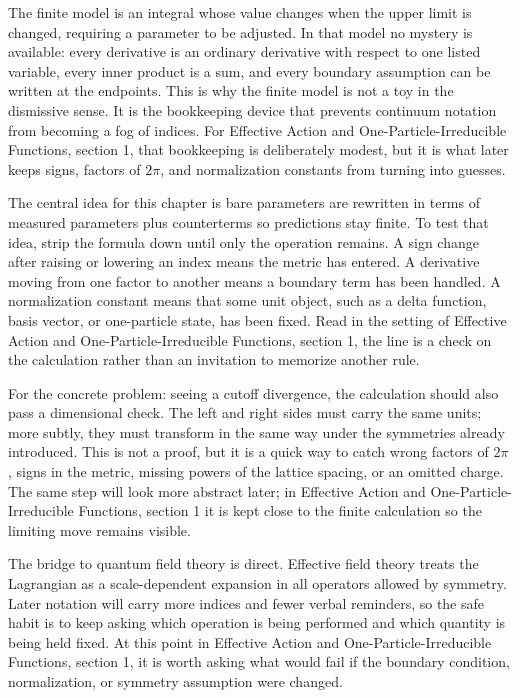 The finite model is an integral whose value changes when the upper limit is changed, requiring a parameter to be adjusted.  In that model no mystery is available: every derivative is an ordinary derivative with respect to one listed variable, every inner product is a sum, and every boundary assumption can be written at the endpoints.  This is why the finite model is not a toy in the dismissive sense.  It is the bookkeeping device that prevents continuum notation from becoming a fog of indices.  For Effective Action and One-Particle-Irreducible Functions, section 1, that bookkeeping is deliberately modest, but it is what later keeps signs, factors of \(2\pi\), and normalization constants from turning into guesses.

The central idea for this chapter is bare parameters are rewritten in terms of measured parameters plus counterterms so predictions stay finite.  To test that idea, strip the formula down until only the operation remains.  A sign change after raising or lowering an index means the metric has entered.  A derivative moving from one factor to another means a boundary term has been handled.  A normalization constant means that some unit object, such as a delta function, basis vector, or one-particle state, has been fixed.  Read in the setting of Effective Action and One-Particle-Irreducible Functions, section 1, the line is a check on the calculation rather than an invitation to memorize another rule.

For the concrete problem: seeing a cutoff divergence, the calculation should also pass a dimensional check.  The left and right sides must carry the same units; more subtly, they must transform in the same way under the symmetries already introduced.  This is not a proof, but it is a quick way to catch wrong factors of \(2\pi\), signs in the metric, missing powers of the lattice spacing, or an omitted charge.  The same step will look more abstract later; in Effective Action and One-Particle-Irreducible Functions, section 1 it is kept close to the finite calculation so the limiting move remains visible.

The bridge to quantum field theory is direct.  Effective field theory treats the Lagrangian as a scale-dependent expansion in all operators allowed by symmetry.  Later notation will carry more indices and fewer verbal reminders, so the safe habit is to keep asking which operation is being performed and which quantity is being held fixed.  At this point in Effective Action and One-Particle-Irreducible Functions, section 1, it is worth asking what would fail if the boundary condition, normalization, or symmetry assumption were changed.

